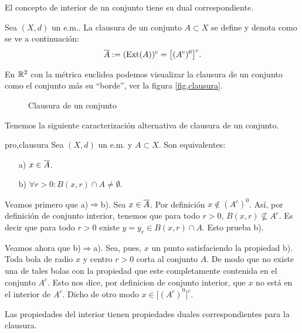 El concepto de interior de un conjunto tiene su dual
correspondiente.
\begin{definicion}{} Sea $(X,d)$ un e.m.. La clausura de un conjunto $A\subset
X$ se define y denota como se ve a continuación:
\[\overline{A}:=(\text{Ext}(A))^c=\bigl[(A^c)^0\bigr]^c.\]
\end{definicion}

 En $\mathbb{R}^2$ con la métrica euclidea podemos visualizar la
clausura de un conjunto  como el conjunto más su ``borde'', ver
la figura \vref{fig,clausura}.

\begin{figure}
\begin{center}
	\caption{Clausura de un conjunto}\label{fig,clausura}
\end{center}
\end{figure}

Tenemos la siguiente caracterización alternativa de clausura de
un conjunto.
\begin{proposicion}{pro,clausura} Sea $(X,d)$ un e.m. y $A\subset X$. Son
equivalentes:
\begin{itemize}
\item[a)] $x\in \overline{A}$.
\item[b)] $\forall r>0: B(x,r)\cap A\neq\emptyset$.
\end{itemize}
\end{proposicion}
\begin{demo}Veamos primero que a)$\Rightarrow$b). Sea $x\in \overline{A}$. Por
definición $x\notin (A^c)^0$. Así, por definición de
conjunto interior, tenemos que para todo $r>0$, $B(x,r)\nsubseteq
A^c$. Es decir que para todo $r>0$ existe $y=y_r\in B(x,r)\cap A$.
Esto prueba b).

Veamos ahora que b)$\Rightarrow$a). Sea, pues, $x$ un punto
satisfaciendo la propiedad b). Toda bola de radio $x$ y centro
$r>0$ corta al conjunto $A$. De modo que no existe una de tales
bolas con la propiedad que este completamente contenida en el
conjunto $A^c$. Esto nos dice, por definicion de conjunto
interior, que $x$ no está en el interior de $A^c$. Dicho de otro
modo $x\in \bigl[(A^c)^0\bigr]^c$.
\end{demo}

Las propiedades del interior tienen propiedades duales
correspondientes para la clausura.

